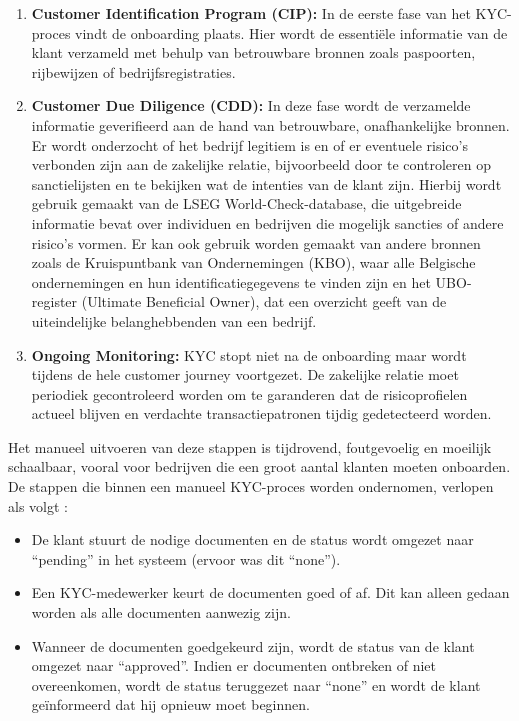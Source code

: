 \begin{enumerate}
    \item \textbf{Customer Identification Program (CIP):} In de eerste fase van het KYC-proces vindt de onboarding plaats. Hier wordt de essentiële informatie van de klant verzameld met behulp van betrouwbare bronnen zoals paspoorten, rijbewijzen of bedrijfsregistraties.
    \item \textbf{Customer Due Diligence (CDD):} In deze fase wordt de verzamelde informatie geverifieerd aan de hand van betrouwbare, onafhankelijke bronnen. \\ Er wordt onderzocht of het bedrijf legitiem is en of er eventuele risico's verbonden zijn aan de zakelijke relatie, bijvoorbeeld door te controleren op sanctielijsten en te bekijken wat de intenties van de klant zijn.
    Hierbij wordt gebruik gemaakt van de LSEG World-Check-database, die uitgebreide informatie bevat over individuen en bedrijven die mogelijk sancties of andere risico's vormen. Er kan ook gebruik worden gemaakt van
    andere bronnen zoals de Kruispuntbank van Ondernemingen (KBO), waar alle Belgische ondernemingen en hun identificatiegegevens te vinden zijn en het UBO-register (Ultimate Beneficial Owner), dat een overzicht geeft van de uiteindelijke belanghebbenden van een bedrijf.
    \item \textbf{Ongoing Monitoring:} KYC stopt niet na de onboarding maar wordt tijdens de hele customer journey voortgezet. De zakelijke relatie moet periodiek gecontroleerd worden om te garanderen dat de risicoprofielen actueel blijven en verdachte transactiepatronen tijdig gedetecteerd worden.
\end{enumerate}

Het manueel uitvoeren van deze stappen is tijdrovend, foutgevoelig en moeilijk schaalbaar, vooral voor bedrijven die een groot aantal klanten moeten onboarden.
De stappen die binnen een manueel KYC-proces worden ondernomen, verlopen als volgt \autocite{SDKFinance2024}:
\begin{itemize}
    \item De klant stuurt de nodige documenten en de status wordt omgezet naar ``pending'' in het systeem (ervoor was dit ``none''). 
    \item Een KYC-medewerker keurt de documenten goed of af. Dit kan alleen gedaan worden als alle documenten aanwezig zijn.
    \item Wanneer de documenten goedgekeurd zijn, wordt de status van de klant omgezet naar ``approved''. Indien er documenten ontbreken of niet overeenkomen, wordt de status teruggezet naar ``none'' en wordt de klant geïnformeerd dat hij opnieuw moet beginnen.
\end{itemize}

